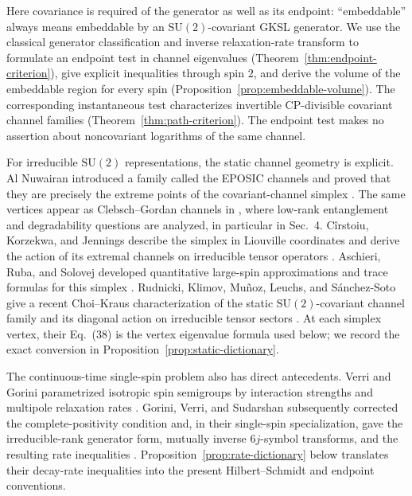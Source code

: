 \documentclass[twoside,10pt]{article}
\numberwithin{equation}{section}
\theoremstyle{slbody}
\theoremstyle{definition}
\theoremstyle{remark}
\newcommand{\SU}{\mathrm{SU}(2)}
\begin{document}
Here covariance is required of the generator as well as its endpoint:
``embeddable'' always means embeddable by an \(\SU\)-covariant GKSL
generator.  We use the classical generator classification and inverse
relaxation-rate transform to formulate an endpoint test in channel
eigenvalues (Theorem~\ref{thm:endpoint-criterion}), give explicit
inequalities through spin \(2\), and derive the volume of the embeddable
region for every spin (Proposition~\ref{prop:embeddable-volume}).
The corresponding instantaneous test characterizes invertible
CP-divisible covariant channel families
(Theorem~\ref{thm:path-criterion}).  The endpoint test makes no assertion
about noncovariant logarithms of the same channel.

For irreducible \(\SU\) representations, the static channel geometry
is explicit.  Al Nuwairan introduced a family called the EPOSIC channels
and proved that they are precisely
the extreme points of the covariant-channel simplex
\cite[Proposition~4.1]{AlNuwairan2014}.  The same vertices appear as
Clebsch--Gordan channels in
\cite[Sec.~2]{ChangKimKwakLeeYoun2022}, where low-rank entanglement and
degradability questions are analyzed, in particular in Sec.~4.
C{\^i}rstoiu, Korzekwa, and Jennings describe the simplex in Liouville
coordinates and derive the action of its extremal channels on
irreducible tensor operators
\cite[Theorem~7 and Appendix~B]{CirstoiuKorzekwaJennings2020}.
Aschieri, Ruba, and Solovej developed quantitative large-spin
approximations and trace formulas for this simplex
\cite[Sec.~1]{AschieriRubaSolovej2024}.
Rudnicki, Klimov, Mu{\~n}oz, Leuchs, and S{\'a}nchez-Soto give a recent
Choi--Kraus characterization of the static \(\SU\)-covariant channel
family and its diagonal action on irreducible tensor sectors
\cite[Secs.~4--5, especially Eq.~(38)]
{RudnickiKlimovMunozLeuchsSanchezSoto2026}.  At each simplex vertex,
their Eq.~(38) is the vertex eigenvalue formula used below; we record
the exact conversion in Proposition~\ref{prop:static-dictionary}.

The continuous-time single-spin problem also has direct antecedents.
Verri and Gorini parametrized isotropic spin semigroups by interaction
strengths and multipole relaxation rates
\cite[p.~1803]{VerriGorini1978}.  Gorini, Verri, and Sudarshan subsequently
corrected the complete-positivity condition and, in their single-spin
specialization, gave the irreducible-rank generator form, mutually
inverse \(6j\)-symbol transforms, and the resulting rate inequalities
\cite[Sec.~2, Eqs.~(2.8), (2.15)--(2.16), and (2.20)--(2.21)]
{GoriniVerriSudarshan1980}.  Proposition~\ref{prop:rate-dictionary}
below translates their decay-rate inequalities into the present
Hilbert--Schmidt and endpoint conventions.
\end{document}

